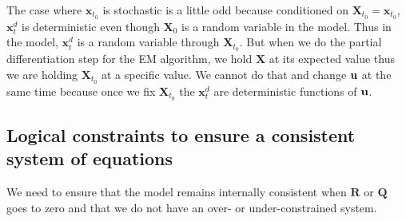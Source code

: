 \documentclass[]{article}
\def\QQ{\mbox{$\mathbf Q$}}	 \def\qq{\mbox{$\mathbf q$}}
\def\RR{\mbox{$\mathbf R$}}	 \def\rr{\mbox{$\mathbf r$}}
\def\XX{\mbox{$\pmb{X}$}}	\def\xx{\mbox{$\pmb{x}$}}
\begin{document}
The case where $\xx_{t_0}$ is stochastic is a little odd because conditioned on $\XX_{t_0}=\xx_{t_0}$, $\xx_t^d$ is deterministic even though $\XX_0$ is a random variable in the model.  Thus in the model, $\xx_t^d$ is a random variable through $\XX_{t_0}$.  But when we do the partial differentiation step for the EM algorithm, we hold $\XX$ at its expected value thus we are holding $\XX_{t_0}$ at a specific value.  We cannot do that and change $\mbox{$\mathbf u$}$ at the same time because once we fix $\XX_{t_0}$ the  $\xx_t^d$ are deterministic functions of $\mbox{$\mathbf u$}$.

\subsection{Logical constraints to ensure a consistent system of equations}
We need to ensure that the model remains internally consistent when $\RR$ or $\QQ$ goes to zero and that we do not have an over- or under-constrained system.
\end{document}
